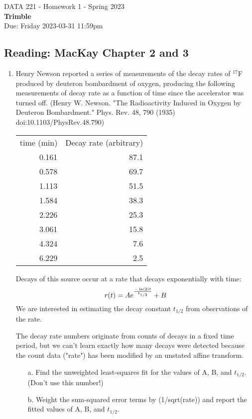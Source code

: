 \documentclass[12pt]{book}
\theoremstyle{definition}
\begin{document}
\begin{center}
{\Large DATA 221 -  Homework 1  - Spring 2023   }\\
\textbf{Trimble}\\ %
Due: Friday 2023-03-31  11:59pm
\end{center}

\vspace{0.2 cm}

\subsection*{Reading:  MacKay Chapter 2 and 3}

\begin{enumerate}
\item  Henry Newson reported a series of measurements of the decay rates of $^{17}$F produced by deuteron bombardment of oxygen, producing the following measurements of decay rate as a function of time since the accelerator was turned off. (Henry W. Newson.  "The Radioactivity Induced in Oxygen by Deuteron Bombardment." Phys. Rev. 48, 790 (1935) doi:10.1103/PhysRev.48.790)

\begin{tabular}{rr} \\
time (min) &    Decay rate (arbitrary) \\
0.161 & 87.1 \\
0.578 & 69.7 \\
1.113 & 51.5 \\
1.584 & 38.3 \\
2.226 & 25.3 \\
3.061 & 15.8 \\
4.324 & 7.6 \\
6.229 & 2.5 \\
\end{tabular}

Decays of this source occur at a rate that decays exponentially with time:
$$ r(t) = A e ^{ - \ln (2) t \over t_{1/2} } + B $$
We are interested in estimating the decay constant $t_{1/2}$ from observations of the rate.  

The decay rate numbers originate from counts of decays in a fixed time period, but we can't learn exactly how many decays were detected because the count data ("rate") has been modified by an unstated affine transform.

 \begin{enumerate}[label=\alph*)]
  \item[a.] Find the unweighted least-squares fit for the values of A, B, and $t_{1/2}$.   (Don't use this number!)
  \item[b.] Weight the sum-squared error terms by (1/sqrt(rate)) and report the fitted values of A, B, and $t_{1/2}$.  
 \end{enumerate}


\end{enumerate}
\end{document}
